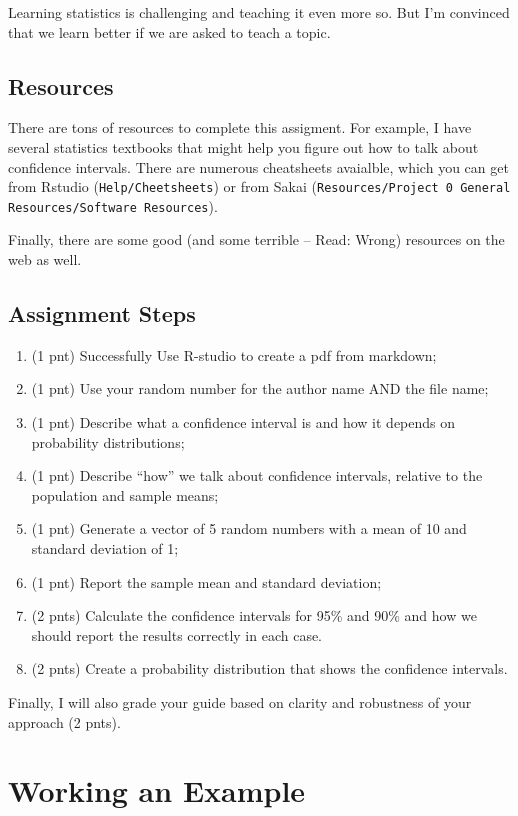 \documentclass{tufte-handout}\usepackage[]{graphicx}\usepackage[]{color}
\begin{document}
Learning statistics is challenging and teaching it even more so. But I'm convinced that we learn better if we are asked to teach a topic. 

\subsection{Resources}

There are tons of resources to complete this assigment. For example, I have several statistics textbooks that might help you figure out how to talk about confidence intervals. 
There are numerous cheatsheets avaialble, which you can get from Rstudio (\texttt{Help/Cheetsheets}) or from Sakai (\texttt{Resources/Project 0 General Resources/Software Resources}).

Finally, there are some good (and some terrible -- Read: Wrong) resources on the web as well. 

\subsection{Assignment Steps}

\begin{enumerate}
  \item (1 pnt) Successfully Use R-studio to create a pdf from markdown; 
  \item (1 pnt) Use your random number for the author name AND the file name;
  \item (1 pnt) Describe what a confidence interval is and how it depends on probability distributions; 
  \item (1 pnt) Describe ``how'' we talk about confidence intervals, relative to the population and sample means;
  \item (1 pnt) Generate a vector of 5 random numbers with a mean of 10 and standard deviation of 1;
  \item (1 pnt) Report the sample mean and standard deviation;
  \item (2 pnts) Calculate the confidence intervals for 95\% and 90\% and how we should report the results correctly in each case.
  \item (2 pnts) Create a probability distribution that shows the confidence intervals.
  
\end{enumerate}

Finally, I will also grade your guide based on clarity and robustness of your approach (2 pnts). 

\section{Working an Example}
\end{document}
